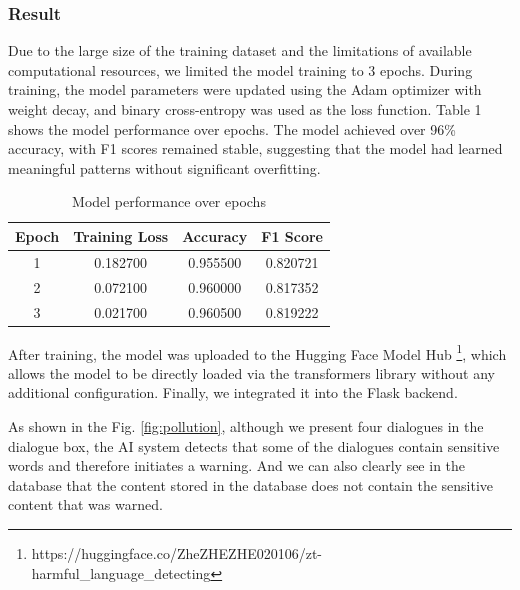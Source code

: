 \documentclass{article}
\begin{document}
\subsubsection{Result}
Due to the large size of the training dataset and the limitations of available computational resources, we limited the model training to 3 epochs. During training, the model parameters were updated using the Adam optimizer with weight decay, and binary cross-entropy was used as the loss function.  Table 1 shows the model performance over epochs. The model achieved over 96\% accuracy, with F1 scores remained stable, suggesting that the model had learned meaningful patterns without significant overfitting. 
\begin{table}
\centering
\caption{Model performance over epochs}
\begin{tabular}{|c|c|c|c|}
\hline
\textbf{Epoch} & \textbf{Training Loss} & \textbf{Accuracy} & \textbf{F1 Score} \\
\hline
1 & 0.182700 & 0.955500 & 0.820721 \\
2 & 0.072100 & 0.960000 & 0.817352 \\
3 & 0.021700 & 0.960500 & 0.819222 \\
\hline
\end{tabular}
\label{tab:training_metrics}
\end{table}

After training, the model was uploaded to the Hugging Face Model Hub \footnote{https://huggingface.co/ZheZHEZHE020106/zt-harmful_language_detecting}, which allows the model to be directly loaded via the transformers library without any additional configuration. Finally, we integrated it into the Flask backend.

As shown in the Fig. \ref{fig:pollution}, although we present four dialogues in the dialogue box, the AI system detects that some of the dialogues contain sensitive words and therefore initiates a warning. 
And we can also clearly see in the database that the content stored in the database does not contain the sensitive content that was warned.
\end{document}

